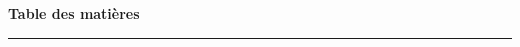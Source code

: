 \renewcommand{\contentsname}{}
\thispagestyle{fancy}
{\Large\bfseries\color{maroon} Table des matières}\par
\vspace{0.2cm}
{\color{maroon}\rule{\linewidth}{0.8pt}}\par
\vspace{0.8cm}
\tableofcontents
